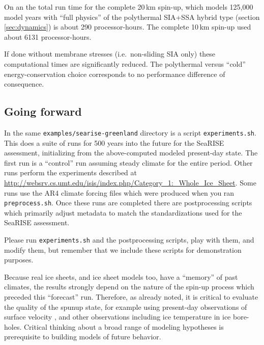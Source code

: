 
On an the total run time for the complete 20\,km spin-up, which models 125,000 model years with ``full physics'' of the polythermal SIA+SSA hybrid type (section \ref{sec:dynamics}) is about 290 processor-hours.  The complete 10\,km spin-up used about 6131 processor-hours.

If done without membrane stresses (i.e.~non-sliding SIA only) these computational times are significantly reduced.  The polythermal versus ``cold'' energy-conservation choice corresponds to no performance difference of consequence.


\subsection{Going forward}  \label{subsect:forecastcaution}  In the same \verb|examples/searise-greenland| directory is a script \verb|experiments.sh|.  This does a suite of runs for 500 years into the future for the SeaRISE assessment, initializing from the above-computed modeled present-day state.  The first run is a ``control''  run assuming steady climate for the entire period.  Other runs perform the experiments described at \url{http://websrv.cs.umt.edu/isis/index.php/Category_1:_Whole_Ice_Sheet}.  Some runs use the AR4 climate forcing files which were produced when you ran \texttt{preprocess.sh}.  Once these runs are completed there are postprocessing scripts which primarily adjust metadata to match the standardizations used for the SeaRISE assessment.

Please run \verb|experiments.sh| and the postprocessing scripts, play with them, and modify them, but remember that we include these scripts for demonstration purposes.

Because real ice sheets, and ice sheet models too, have a ``memory'' of past climates, the results strongly depend on the nature of the spin-up process which preceded this ``forecast'' run.  Therefore, as already noted, it is critical to evaluate the quality of the spunup state, for example using present-day observations of surface velocity \cite{AschwandenAdalgeirsdottirKhroulev}, and other observations including ice temperature in ice bore-holes.  Critical thinking about a broad range of modeling hypotheses is prerequisite to building models of future behavior.


